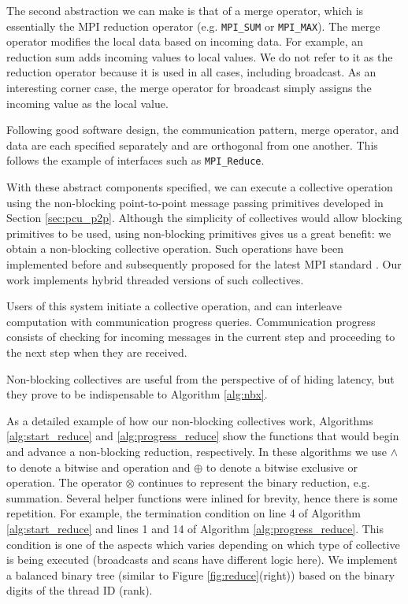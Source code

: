 The second abstraction we can make is that of a merge operator, which is
essentially the MPI reduction operator
(e.g. \texttt{MPI\_SUM} or \texttt{MPI\_MAX}).
The merge operator modifies the local data based on incoming data.
For example, an reduction sum adds incoming values to local values.
We do not refer to it as the reduction operator because it is used
in all cases, including broadcast.
As an interesting corner case, the merge operator for broadcast simply
assigns the incoming value as the local value.

Following good software design, the communication pattern,
merge operator, and data are each specified separately
and are orthogonal from one another.
This follows the example of interfaces such as \texttt{MPI\_Reduce}.

With these abstract components specified, we can execute a collective
operation
using the non-blocking point-to-point message passing primitives
developed in Section \ref{sec:pcu_p2p}.
Although the simplicity of collectives would allow blocking primitives
to be used, using non-blocking primitives gives us a great benefit:
we obtain a non-blocking collective operation.
Such operations have been implemented before \cite{hoefler2007implementation}
and subsequently proposed for the latest MPI standard \cite{hoefler2006non}.
Our work implements hybrid threaded versions of such collectives.

Users of this system initiate a collective operation, and can interleave
computation with communication progress queries.
Communication progress consists of checking for incoming messages in the current
step and proceeding to the next step when they are received.

Non-blocking collectives are useful from the perspective of
of hiding latency, but they prove to be indispensable to
Algorithm \ref{alg:nbx}.

As a detailed example of how our non-blocking collectives work,
Algorithms \ref{alg:start_reduce} and \ref{alg:progress_reduce}
show the functions that would begin and advance a non-blocking
reduction, respectively.
In these algorithms we use $\wedge$ to denote a bitwise and
operation and $\oplus$ to denote a bitwise exclusive or operation.
The operator $\otimes$ continues to represent the binary reduction,
e.g. summation.
Several helper functions were inlined for brevity, hence there
is some repetition.
For example, the termination condition on line 4 of Algorithm
\ref{alg:start_reduce} and lines 1 and 14 of Algorithm \ref{alg:progress_reduce}.
This condition is one of the aspects which varies depending on
which type of collective is being executed (broadcasts and scans
have different logic here).
We implement a balanced binary tree (similar to Figure \ref{fig:reduce}(right))
based on the binary digits of the thread ID (rank).

